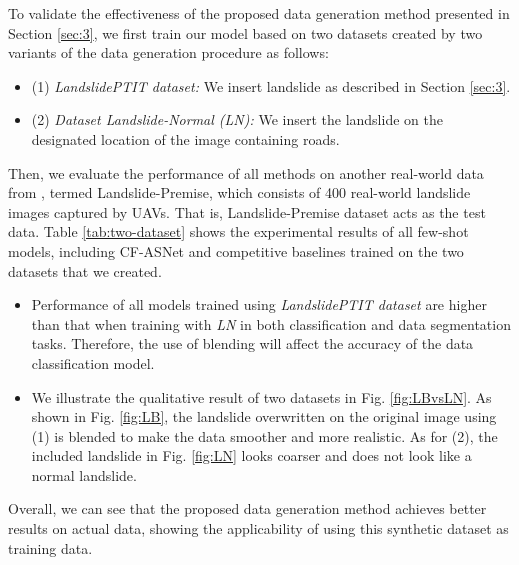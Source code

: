 \documentclass{ieeeaccess}
\begin{document}
To validate the effectiveness of the proposed data generation method presented in Section \ref{sec:3}, we first train our model based on two datasets created by two variants of the data generation procedure as follows:
\begin{itemize}
    \item (1) \textit{LandslidePTIT dataset:} We insert landslide as described in Section \ref{sec:3}.
    \item (2) \textit{Dataset Landslide-Normal (LN):} We insert the landslide on the designated location of the image containing roads. 
\end{itemize}
Then, we evaluate the performance of all methods on another real-world data from \cite{landslide_2stage}, termed Landslide-Premise, which consists of 400 real-world landslide images captured by UAVs. That is, Landslide-Premise dataset acts as the test data. Table \ref{tab:two-dataset} shows the experimental results of all few-shot models, including CF-ASNet and competitive baselines trained on the two datasets that we created.

\begin{itemize}
    \item Performance of all models trained using \textit{LandslidePTIT dataset} are higher than that when training with \textit{LN} in both classification and data segmentation tasks. Therefore, the use of blending will affect the accuracy of the data classification model.
    \item We illustrate the qualitative result of two datasets in Fig. \ref{fig:LBvsLN}. As shown in Fig. \ref{fig:LB}, the landslide  overwritten on the original image using (1) is blended to make the data smoother and more realistic. As for (2), the included landslide  in Fig. \ref{fig:LN} looks coarser and does not look like a normal landslide.
\end{itemize}

Overall, we can see that the proposed data generation method achieves better results on actual data, showing the applicability of using this synthetic dataset as training data. 
\end{document}
